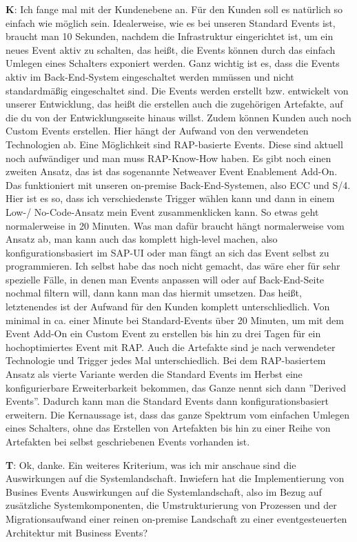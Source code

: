 \begin{list}{X:}{\setlength{\labelsep}{5mm}}
    \item[\textbf{K}:] Ich fange mal mit der Kundenebene an. Für den Kunden soll es natürlich so einfach wie möglich sein. Idealerweise, wie es bei unseren Standard Events ist, braucht man 10 Sekunden, nachdem die Infrastruktur eingerichtet ist, um ein neues Event aktiv zu schalten, das hei{\ss}t, die Events können durch das einfach Umlegen eines Schalters exponiert werden. Ganz wichtig ist es, dass die Events aktiv im Back-End-System eingeschaltet werden mmüssen und nicht standardmä{\ss}ig eingeschaltet sind. Die Events werden erstellt bzw. entwickelt von unserer Entwicklung, das hei{\ss}t die erstellen auch die zugehörigen Artefakte, auf die du von der Entwicklungsseite hinaus willst. Zudem können Kunden auch noch Custom Events erstellen. Hier hängt der Aufwand von den verwendeten Technologien ab. Eine Möglichkeit sind RAP-basierte Events. Diese sind aktuell noch aufwändiger und man muss RAP-Know-How haben. Es gibt noch einen zweiten Ansatz, das ist das sogenannte Netweaver Event Enablement Add-On. Das funktioniert mit unseren on-premise Back-End-Systemen, also ECC und S/4. Hier ist es so, dass ich verschiedenste Trigger wählen kann und dann in einem Low-/ No-Code-Ansatz mein Event zusammenklicken kann. So etwas geht normalerweise in 20 Minuten. Was man dafür braucht hängt normalerweise vom Ansatz ab, man kann auch das komplett high-level machen, also konfigurationsbasiert im SAP-UI oder man fängt an sich das Event selbst zu programmieren. Ich selbst habe das noch nicht gemacht, das wäre eher für sehr spezielle Fälle, in denen man Events anpassen will oder auf Back-End-Seite nochmal filtern will, dann kann man das hiermit umsetzen. Das hei{\ss}t, letztenendes ist der Aufwand für den Kunden komplett unterschliedlich. Von minimal in ca. einer Minute bei Standard-Events über 20 Minuten, um mit dem Event Add-On ein Custom Event zu erstellen bis hin zu drei Tagen für ein hochoptimiertes Event mit RAP. Auch die Artefakte sind je nach verwendeter Technologie und Trigger jedes Mal unterschiedlich. Bei dem RAP-basiertem Ansatz als vierte Variante werden die Standard Events im Herbst eine konfigurierbare Erweiterbarkeit bekommen, das Ganze nennt sich dann ''Derived Events''. Dadurch kann man die Standard Events dann konfigurationsbasiert erweitern. Die Kernaussage ist, dass das ganze Spektrum vom einfachen Umlegen eines Schalters, ohne das Erstellen von Artefakten bis hin zu einer Reihe von Artefakten bei selbst geschriebenen Events vorhanden ist.
    \item[\textbf{T}:] Ok, danke. Ein weiteres Kriterium, was ich mir anschaue sind die Auswirkungen auf die Systemlandschaft. Inwiefern hat die Implementierung von Busines Events Auswirkungen auf die Systemlandschaft, also im Bezug auf zusätzliche Systemkomponenten, die Umstrukturierung von Prozessen und der Migrationsaufwand einer reinen on-premise Landschaft zu einer eventgesteuerten Architektur mit Business Events?

\end{list}
